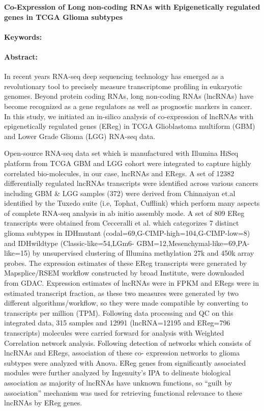 \noindent
\large {\bf Co-Expression of Long non-coding RNAs with Epigenetically regulated genes in TCGA Glioma subtypes} 


\normalsize 


\noindent \paragraph{Keywords:} 

\noindent \paragraph{Abstract:} 

 In recent years RNA-seq deep sequencing technology has emerged as a
revolutionary tool to precisely measure transcriptome profiling in eukaryotic genomes. Beyond
protein coding RNAs, long non-coding RNAs (lncRNAs) have become recognized as a gene
regulators as well as prognostic markers in cancer. In this study, we initiated an in-silico analysis
of co-expression of lncRNAs with epigenetically regulated genes (EReg) in TCGA Glioblastoma
multiform (GBM) and Lower Grade Glioma (LGG) RNA-seq data.

Open-source RNA-seq data set which is manufactured with Illumina HiSeq platform from
TCGA GBM and LGG cohort were integrated to capture highly correlated bio-molecules, in our
case, lncRNAs and ERegs. A set of 12382 differentially regulated lncRNAs transcripts were
identified across various cancers including GBM & LGG samples (372) were derived from
Chinnaiyan et.al identified by the Tuxedo suite (i.e, Tophat, Cufflink) which perform many aspects
of complete RNA-seq analysis in ab initio assembly mode. A set of 809 EReg transcripts were
obtained from Cecceralli et al. which categorizes 7 distinct glioma subtypes in IDHmutant
(codal=69,G-CIMP-high=104,G-CIMP-low=8)
and
IDHwildtype
(Classic-like=54,LGm6-
GBM=12,Mesenchymal-like=69,PA-like=15) by unsupervised clustering of Illumina methylation
27k and 450k array probes. The expression estimates of these EReg transcripts were generated
by Mapsplice/RSEM workflow constructed by broad Institute, were downloaded from GDAC.
Expression estimates of lncRNAs were in FPKM and ERegs were in estimated transcript fraction,
as these two measures were generated by two different algorithms/workflow, so they were made
compatible by converting to transcripts per million (TPM). Following data processing and QC on
this integrated data, 315 samples and 12991 (lncRNA=12195 and EReg=796 transcripts)
molecules were carried forward for analysis with Weighted Correlation network analysis.
Following detection of networks which consists of lncRNAs and ERegs, association of these co-
expression networks to glioma subtypes were analyzed with Anova. EReg genes from
significantly associated modules were further analyzed by Ingenuity’s IPA to delineate biological
association as majority of lncRNAs have unknown functions, so “guilt by association” mechanism
was used for retrieving functional relevance to these lncRNAs by EReg genes.

